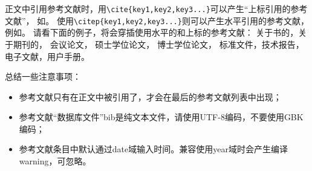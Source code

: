 \documentclass[twoside]{article}
\begin{document}
正文中引用参考文献时，用\verb+\cite{key1,key2,key3...}+可以产生“上标引用的参考文献”，
如\cite{Meta_CN,chen2007act,DPMG}。
使用\verb+\citep{key1,key2,key3...}+则可以产生水平引用的参考文献，
例如\citep{JohnD,zhubajie,IEEE-1363}。
请看下面的例子，将会穿插使用水平的和上标的参考文献：
关于书的\citep{Meta_CN,JohnD,IEEE-1363}，关于期刊的\cite{chen2007act,chen2007ewi}，
会议论文\citep{DPMG,kocher99,cnproceed}，
硕士学位论文\citep{zhubajie,metamori2004}，
博士学位论文\cite{shaheshang,FistSystem01,bai2008}，
标准文件\citep{IEEE-1363}，技术报告\cite{NPB2}，电子文献\citep{xiaoyu2001, CHRISTINE1998}，用户手册\citep{RManual}。

总结一些注意事项：
\begin{itemize}
\item 参考文献只有在正文中被引用了，才会在最后的参考文献列表中出现；
\item 参考文献“数据库文件”bib是纯文本文件，请使用UTF-8编码，不要使用GBK编码；
\item 参考文献条目中默认通过date域输入时间。兼容使用year域时会产生编译warning，可忽略。
\end{itemize}

  
    

    
\end{document}
